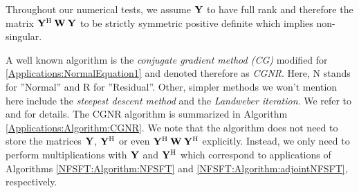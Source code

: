   \begin{remark}
    Throughout our numerical tests, we assume $\mathbf{Y}$ to have full rank and therefore
    the matrix $\mathbf{Y^{\text{\rm{H}}}} \: \mathbf{W} \: \mathbf{Y}$ to be strictly symmetric positive definite
    which implies non-singular.
  \end{remark}
  
  A well known algorithm is the \emph{conjugate gradient method (CG)} modified for 
  \eqref{Applications:NormalEquation1} and denoted therefore as \emph{CGNR}. Here, N stands 
  for ''Normal'' and R for ''Residual''. Other, simpler methods we won't mention here
  include the \emph{steepest descent method} and the \emph{Landweber iteration}. We 
  refer to \cite{bjoerk} and \cite{golo} for details. The CGNR algorithm is summarized in 
  Algorithm \ref{Applications:Algorithm:CGNR}. We note that the algorithm does not 
  need to store the matrices $\mathbf{Y}$, $\mathbf{Y}^{\text{\rm{H}}}$ or even $\mathbf{Y}^{\text{\rm{H}}} \: \mathbf{W} \:
  \mathbf{Y}^{\text{\rm{H}}}$ explicitly. Instead, we only need to perform multiplications with 
  $\mathbf{Y}$ and $\mathbf{Y}^{\text{\rm{H}}}$ which correspond to applications of Algorithms 
  \ref{NFSFT:Algorithm:NFSFT} and \ref{NFSFT:Algorithm:adjointNFSFT}, respectively.
  
